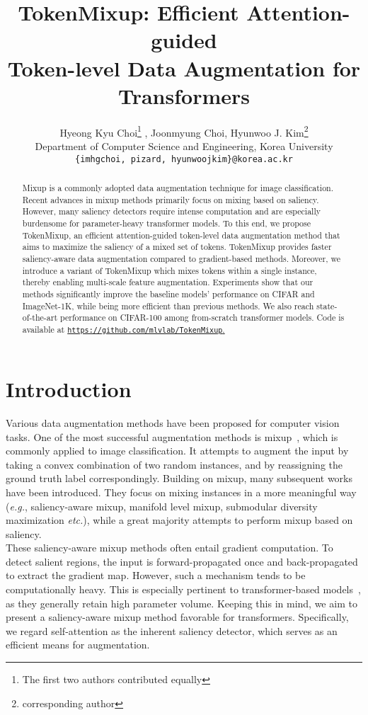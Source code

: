 \documentclass{article}
\title{TokenMixup: Efficient Attention-guided \\ Token-level Data Augmentation for Transformers}
\author{Hyeong Kyu Choi\thanks{The first two authors contributed equally}
  \hspace{0.6mm},
  \hspace{1mm}
  Joonmyung Choi,
  \hspace{0.5mm} Hyunwoo J. Kim\thanks{corresponding author} \\
  Department of Computer Science and Engineering, Korea University\\
  \texttt{\{imhgchoi, pizard, hyunwoojkim\}@korea.ac.kr} \\
}
\begin{document}
\maketitle





\begin{abstract}
    Mixup is a commonly adopted data augmentation technique for image classification.
    Recent advances in mixup methods primarily focus on mixing based on saliency.
    However, many saliency detectors require intense computation and are especially burdensome for parameter-heavy transformer models.
    To this end, we propose TokenMixup, an efficient attention-guided token-level data augmentation method that aims to maximize the saliency of a mixed set of tokens. TokenMixup provides  faster saliency-aware data augmentation compared to gradient-based methods.
    Moreover, we introduce a variant of TokenMixup which mixes tokens within a single instance, thereby enabling multi-scale feature augmentation.
    Experiments show that our methods significantly improve the baseline models' performance on CIFAR and ImageNet-1K, while being more efficient than previous methods.
    We also reach state-of-the-art performance on CIFAR-100 among from-scratch transformer models.
    Code is available at \href{https://github.com/mlvlab/TokenMixup}{\texttt{https://github.com/mlvlab/TokenMixup}.}
\end{abstract} \section{Introduction}
\label{section:introduction}

Various data augmentation methods have been proposed for computer vision tasks.
One of the most successful augmentation methods is mixup~\cite{zhang2017mixup}, which is commonly applied to image classification.
It attempts to augment the input by taking a convex combination of two random instances, and by reassigning the ground truth label correspondingly.
Building on mixup, many subsequent works~\cite{yun2019cutmix, kim2020puzzle, kim2021co, uddin2020saliencymix,verma2019manifold, venkataramanan2021alignmix, hong2021stylemix, dabouei2021supermix} have been introduced.
They focus on mixing instances in a more meaningful way (\textit{e.g.}, saliency-aware mixup, manifold level mixup, submodular diversity maximization \textit{etc.}), while a great majority attempts to perform mixup based on saliency.\\
These saliency-aware mixup methods often entail gradient computation.
To detect salient regions, the input is forward-propagated once and back-propagated to extract the gradient map.
However, such a mechanism tends to be computationally heavy. 
This is especially pertinent to transformer-based models~\cite{vaswani2017attention}, as they generally retain high parameter volume.
Keeping this in mind, we aim to present a saliency-aware mixup method favorable for transformers.
Specifically, we regard self-attention as the inherent saliency detector, which serves as an efficient means for augmentation.
\end{document}

